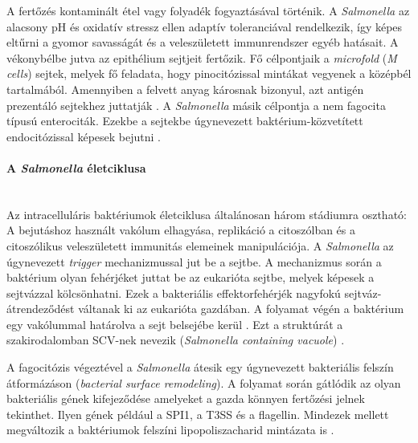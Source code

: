\documentclass[a4paper,12pt]{article}
\begin{document}
		A fertőzés kontaminált étel vagy folyadék fogyaztásával történik. A \textit{Salmonella} az alacsony pH és oxidatív stressz ellen adaptív toleranciával rendelkezik, így képes eltűrni a gyomor savasságát és a veleszületett immunrendszer egyéb hatásait. A vékonybélbe jutva az epithélium sejtjeit fertőzik. Fő célpontjaik a \textit{microfold} (\textit{M cells}) sejtek, melyek fő feladata, hogy pinocitózissal mintákat vegyenek a középbél tartalmából. Amennyiben a felvett anyag károsnak bizonyul, azt antigén prezentáló sejtekhez juttatják \cite{salmonella_and_host_cell_nature}. A \textit{Salmonella} másik célpontja a nem fagocita típusú enterociták. Ezekbe a sejtekbe úgynevezett baktérium-közvetített endocitózissal képesek bejutni \cite{salmonella_and_host_cell_nature}.


		\paragraph{A \textit{Salmonella} életciklusa} \mbox{}\\
		Az intracelluláris baktériumok életciklusa általánosan három stádiumra osztható: A bejutáshoz használt vakólum elhagyása, replikáció a citoszólban és a citoszólikus veleszületett immunitás elemeinek manipulációja. A \textit{Salmonella} az úgynevezett \textit{trigger} mechanizmussal jut be a sejtbe. A mechanizmus során a baktérium olyan fehérjéket juttat be az eukarióta sejtbe, melyek képesek a sejtvázzal kölcsönhatni. Ezek a bakteriális effektorfehérjék nagyfokú sejtváz-átrendeződést váltanak ki az eukarióta gazdában. A folyamat végén a baktérium egy vakólummal határolva a sejt belsejébe kerül \cite{salmonella_autophagy_nature_old}. Ezt a struktúrát a szakirodalomban SCV-nek nevezik (\textit{Salmonella containing vacuole}) \cite{salmonella_and_host_cell_nature}.

		A fagocitózis végeztével a \textit{Salmonella} átesik egy úgynevezett bakteriális felszín átformázáson (\textit{bacterial surface remodeling}). A folyamat során gátlódik az olyan bakteriális gének kifejeződése amelyeket a gazda könnyen fertőzési jelnek tekinthet. Ilyen gének például a SPI1, a T3SS és a flagellin. Mindezek mellett megváltozik a baktériumok felszíni lipopoliszacharid mintázata is  \cite{salmonella_and_host_cell_nature}.
\end{document}
